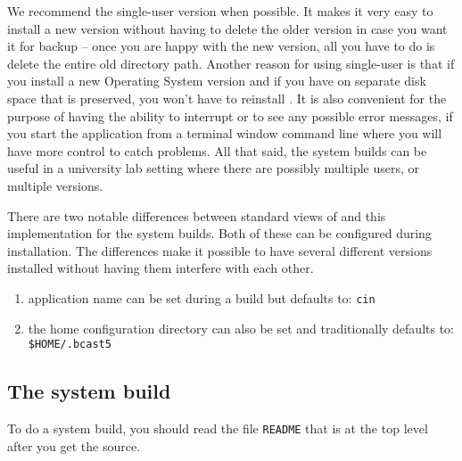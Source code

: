 We recommend the single-user version when possible.  It makes it
very easy to install a new version without having to delete the
older version in case you want it for backup -- once you are happy
with the new version, all you have to do is delete the entire old
directory path.  Another reason for using single-user is that if
you install a new Operating System version and if you have \CGG{}
on separate disk space that is preserved, you won't have to
reinstall \CGG{}.  It is also convenient for the purpose of having
the ability to interrupt or to see any possible error messages, if
you start the application from a terminal window command line
where you will have more control to catch problems.  All that
said, the system builds can be useful in a university lab setting
where there are possibly multiple users, or multiple versions.

There are two notable differences between standard views
of \CGG{} and this implementation for the system builds.  Both of
these can be configured during installation.  The differences make
it possible to have several different versions installed without
having them interfere with each other.

\begin{enumerate}
\item application name can be set during a build but defaults
  to: \texttt{cin}
\item the home configuration directory can also be set and
  traditionally defaults to: \texttt{\$HOME/.bcast5}
\end{enumerate}


\subsection{The system build}
\label{sec:system-build}

To do a system build, you should read the file
\texttt{README} that is at the top level after you get the source.

